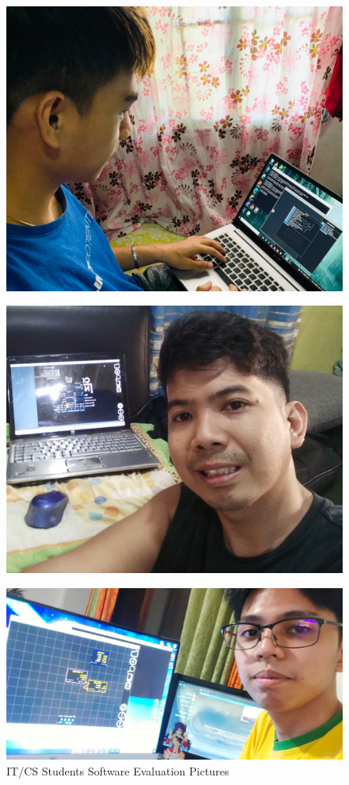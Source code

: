\begin{figure}[H]
	 \centering
	 \includegraphics[width=\textwidth]{evaluators/non_tech/f_ja.jpg}
\end{figure}
\begin{figure}[H]
	 \centering
	 \includegraphics[width=\textwidth]{evaluators/non_tech/f_mr.jpg}
\end{figure}
\begin{figure}[H]
	 \centering
	 \includegraphics[width=\textwidth]{evaluators/non_tech/f_ip.jpg}
	 \caption[]{IT/CS Students Software Evaluation Pictures}
\end{figure}
